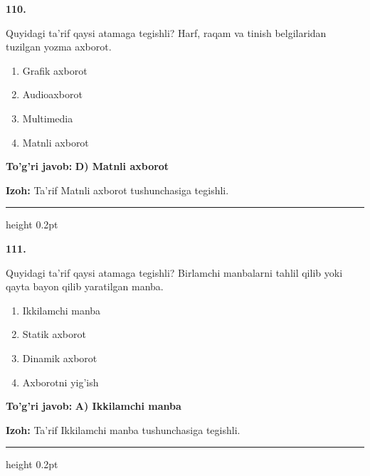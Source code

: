 \documentclass[10pt,a4paper,oneside]{article}
\begin{document}
\noindent\textbf{\color{ink}110.}
\par
Quyidagi ta'rif qaysi atamaga tegishli? Harf, raqam va tinish belgilaridan tuzilgan yozma axborot.
\begin{enumerate}[label=\Alph*),leftmargin=9mm]
\item Grafik axborot
\item Audioaxborot
\item Multimedia
\item Matnli axborot
\end{enumerate}
\begin{tcolorbox}[enhanced,breakable,colback=teal!4,colframe=teal!50!black,boxrule=0.5pt,arc=1.1mm,left=3mm,right=3mm,top=1.7mm,bottom=1.7mm,before skip=2mm,after skip=2mm]
\textbf{\color{teal}To'g'ri javob:} \textbf{D) Matnli axborot}
\par\smallskip
\textbf{Izoh:} Ta'rif Matnli axborot tushunchasiga tegishli.
\end{tcolorbox}
\vspace{2mm}\hrule height 0.2pt \vspace{3mm}

\noindent\textbf{\color{ink}111.}
\par
Quyidagi ta'rif qaysi atamaga tegishli? Birlamchi manbalarni tahlil qilib yoki qayta bayon qilib yaratilgan manba.
\begin{enumerate}[label=\Alph*),leftmargin=9mm]
\item Ikkilamchi manba
\item Statik axborot
\item Dinamik axborot
\item Axborotni yig'ish
\end{enumerate}
\begin{tcolorbox}[enhanced,breakable,colback=teal!4,colframe=teal!50!black,boxrule=0.5pt,arc=1.1mm,left=3mm,right=3mm,top=1.7mm,bottom=1.7mm,before skip=2mm,after skip=2mm]
\textbf{\color{teal}To'g'ri javob:} \textbf{A) Ikkilamchi manba}
\par\smallskip
\textbf{Izoh:} Ta'rif Ikkilamchi manba tushunchasiga tegishli.
\end{tcolorbox}
\vspace{2mm}\hrule height 0.2pt \vspace{3mm}
\end{document}
